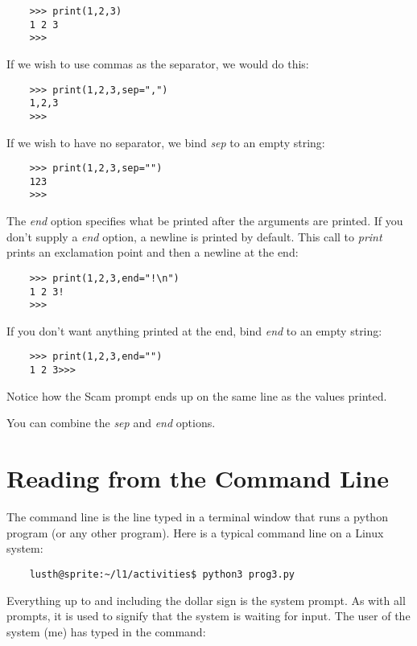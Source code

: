 \begin{verbatim}
    >>> print(1,2,3)
    1 2 3
    >>>
\end{verbatim}

If we wish to use commas as the separator, we would do this:

\begin{verbatim}
    >>> print(1,2,3,sep=",")
    1,2,3
    >>>
\end{verbatim}

If we wish to have no separator, we bind {\it sep} to an empty string:

\begin{verbatim}
    >>> print(1,2,3,sep="")
    123
    >>>
\end{verbatim}

The {\it end} option specifies what be printed after the arguments
are printed. If you don't supply a {\it end} option, a newline
is printed by default. This call to {\it print} prints an exclamation
point and then a newline at the end:

\begin{verbatim}
    >>> print(1,2,3,end="!\n")
    1 2 3!
    >>>
\end{verbatim}

If you don't want anything printed at the end, bind {\it end} to an
empty string:

\begin{verbatim}
    >>> print(1,2,3,end="")
    1 2 3>>>
\end{verbatim}

Notice how the Scam prompt ends up on the same line as
the values printed.

You can combine the {\it sep} and {\it end} options.

\section{Reading from the Command Line}

The command line is the line typed in a terminal window
that runs a python program (or any other program).
Here is a typical command line on a Linux system:

\begin{verbatim}
    lusth@sprite:~/l1/activities$ python3 prog3.py
\end{verbatim}

Everything up to and including the dollar sign is
the system prompt. As with all prompts, it is used
to signify that the system is waiting for input.
The user of the system (me) has typed in the command:

